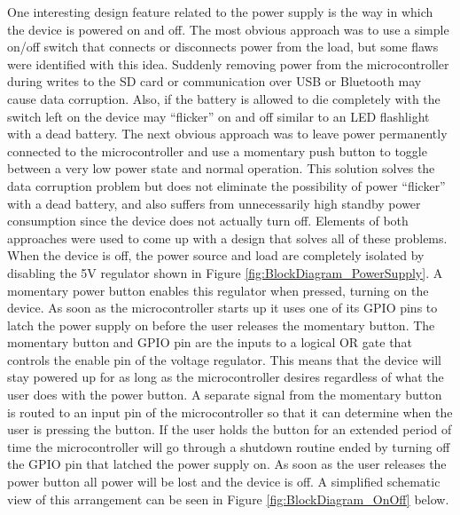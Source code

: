 One interesting design feature related to the power supply is the way in which 
the device is powered on and off. The most obvious approach was to use a simple 
on/off switch that connects or disconnects power from the load, but some flaws 
were identified with this idea. Suddenly removing power from the microcontroller 
during writes to the SD card or communication over USB or Bluetooth may cause 
data corruption. Also, if the battery is allowed to die completely with the 
switch left on the device may “flicker” on and off similar to an LED flashlight 
with a dead battery. The next obvious approach was to leave power permanently 
connected to the microcontroller and use a momentary push button to toggle 
between a very low power state and normal operation. This solution solves the 
data corruption problem but does not eliminate the possibility of power 
“flicker” with a dead battery, and also suffers from unnecessarily high standby 
power consumption since the device does not actually turn off. Elements of both 
approaches were used to come up with a design that solves all of these problems. 
When the device is off, the power source and load are completely isolated by 
disabling the 5V regulator shown in Figure \ref{fig:BlockDiagram_PowerSupply}. 
A momentary power button enables this regulator when pressed, turning on the 
device. As soon as the microcontroller starts up it uses one of its GPIO pins to 
latch the power supply on before the user releases the momentary button. The 
momentary button and GPIO pin are the inputs to a logical OR gate that controls 
the enable pin of the voltage regulator. This means that the device will stay 
powered up for as long as the microcontroller desires regardless of what the 
user does with the power button. A separate signal from the momentary button is 
routed to an input pin of the microcontroller so that it can determine when the 
user is pressing the button. If the user holds the button for an extended period 
of time the microcontroller will go through a shutdown routine ended by turning 
off the GPIO pin that latched the power supply on. As soon as the user releases 
the power button all power will be lost and the device is off. A simplified 
schematic view of this arrangement can be seen in 
Figure \ref{fig:BlockDiagram_OnOff} below.

